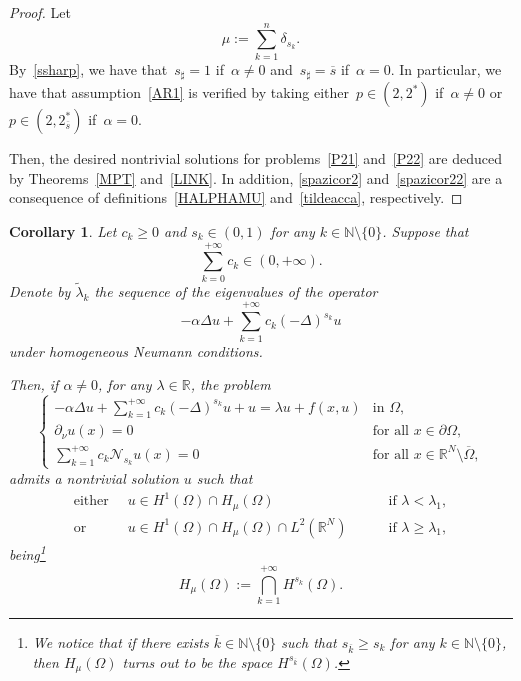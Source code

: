 \documentclass[12pt,a4paper,intlimits,sumlimits]{amsart}
\def \N {\mathbb{N}}
\def \R {\mathbb{R}}
\theoremstyle{definition}
\theoremstyle{plain}
\newtheorem{corollary}[definition]{Corollary}
\numberwithin{equation}{section}
\renewcommand{\ge}{\geqslant}
\begin{document}
\begin{proof}
Let $$\mu:=\displaystyle\sum_{k=1}^n \delta_{s_k}.$$ By~\eqref{ssharp}, we have that~$s_\sharp=1$ if~$\alpha\neq0$ and~$s_\sharp = \overline s$ if~$\alpha=0$. In particular, we have that assumption~\eqref{AR1} is verified by taking either~$p\in (2, 2^*)$ if~$\alpha\neq 0$ or~$p\in (2, 2^*_{\overline s})$ if~$\alpha =0$.

Then, the desired nontrivial solutions for problems~\eqref{P21} and~\eqref{P22} are deduced by Theorems~\ref{MPT} and~\ref{LINK}.
In addition, \eqref{spazicor2} and~\eqref{spazicor22} are a consequence of definitions~\eqref{HALPHAMU} and~\eqref{tildeacca}, respectively. 
\end{proof}


\begin{corollary}\label{cor3}
Let $c_k\ge 0$ and $s_k\in (0, 1)$ for any $k\in\N\setminus\{0\}$. 
Suppose that
$$ \sum_{k=0}^{+\infty} c_k\in(0,+\infty).$$
Denote by $\widetilde\lambda_k$ the sequence of the eigenvalues of the operator
\[
-\alpha\Delta  u + \displaystyle\sum_{k=1}^{+\infty} c_k (-\Delta)^{s_k} u
\]
under homogeneous Neumann conditions.

Then, if $\alpha\neq 0$, for any $\lambda\in\R$, the problem
\begin{equation}\label{P31}
\begin{cases}
-\alpha\Delta  u + \displaystyle\sum_{k=1}^{+\infty} c_k (-\Delta)^{s_k} u +u=\lambda u +f(x,u)  &\mbox{in }\Omega,\\
\partial_\nu u(x)=0  &\mbox{for all } x\in \partial\Omega,\\
\displaystyle\sum_{k=1}^{+\infty} c_k \mathscr N_{s_k} u(x)=0 &\mbox{for all }x\in \R^N \setminus \overline{\Omega}, 
\end{cases}
\end{equation}
admits a nontrivial solution $u$ such that
\begin{equation}\label{spazicor3}
\begin{alignedat}{2}
\mbox{either } \ & u\in H^1(\Omega)\cap H_\mu(\Omega)  \quad&&\mbox{ if } \lambda<\lambda_1,\\
\mbox{or } \ &u\in H^1(\Omega)\cap H_{\mu}(\Omega)\cap L^2(\R^N) \quad&&\mbox{ if } \lambda\ge\lambda_1,
\end{alignedat}
\end{equation}
being\footnote{We notice that if there exists $\overline k\in\N\setminus\{0\}$ such that $s_{\overline k}\ge s_k$ for any $k\in\N\setminus\{0\}$, then $H_\mu(\Omega)$ turns out to be the space $H^{s_{\overline k}}(\Omega)$.}
\[
H_\mu (\Omega):=\bigcap_{k=1}^{+\infty} H^{s_k}(\Omega).
\]


\end{corollary}
\end{document}
